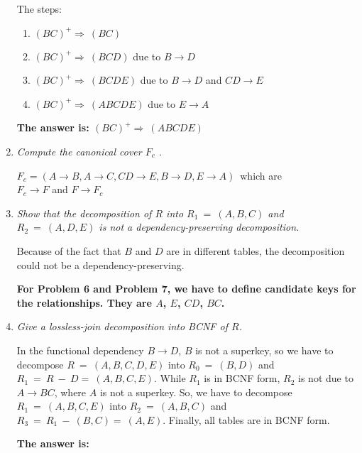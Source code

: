 \documentclass[paper=8.27in:11.69in, 14pt, DIV=calc]{scrartcl}
\begin{document}
\begin{enumerate}[label=\arabic*)]
The steps:

\begin{enumerate}[label=\arabic*)]

\item $(BC)^{+}\Rightarrow \ (BC)$
\item $(BC)^{+}\Rightarrow \ (BCD)$ due to $B \rightarrow D$
\item $(BC)^{+}\Rightarrow \ (BCDE)$ due to $B \rightarrow D$ and $CD \rightarrow E$
\item $(BC)^{+}\Rightarrow \ (ABCDE)$ due to $E \rightarrow A$

\end{enumerate}

\textbf{The answer is: $(BC)^{+}\Rightarrow \ (ABCDE)$}

\newpage
\item \textit{Compute the canonical cover $F_{c}$ .\\}

$F_{c} = (A \rightarrow B, A \rightarrow C, CD \rightarrow E, B \rightarrow D, E \rightarrow A)$\ which are \\ $F_{c} \rightarrow F$ and $F \rightarrow F_{c}$

\newpage
\item \textit{Show that the decomposition of $R$ into $R_{1} \ = \ (A, B, C)$ and $R_{2} \ = \ (A, D, E)$ is not a dependency-preserving decomposition.\\}

Because of the fact that $B$ and $D$ are in different tables, the decomposition could not be a dependency-preserving.

\newpage
\textbf{For Problem 6 and Problem 7, we have to define candidate keys for the relationships. They are $A$, $E$, $CD$, $BC$.}

\item \textit{Give a lossless-join decomposition into BCNF of $R$.\\}

In the functional dependency $B \rightarrow D$, $B$ is not a superkey, so we have to decompose $R \ = \ (A, B, C, D, E)$ into $R_{0} \ = \ (B, D)$ and $R_{1} \ = \ R \ - \ D = \ (A, B, C, E) $. While $R_{1}$ is in BCNF form, $R_{2}$ is not due to $A \rightarrow BC$, where $A$ is not a superkey. So, we have to decompose $R_{1} \ = \ (A, B, C, E)$ into $R_{2} \ = \ (A, B, C)$ and $R_{3} \ = \ R_{1} \ - \ (B, C) = \ (A, E) $. Finally, all tables are in BCNF form.

\textbf{The answer is:}


\end{enumerate}
\end{document}
